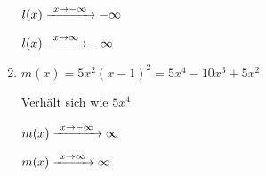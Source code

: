 \begin{Answer}[ref=ganzVerA1]
\begin{minipage}{\textwidth}
\begin{minipage}[t]{0.5\textwidth}
\begin{enumerate}[label=\alph*)]
				\(l(x)\xrightarrow{\hphantom{\ }x\to-\infty\hphantom{\ }}-\infty\)

				\(l(x)\xrightarrow{\hphantom{\ }x\to\infty\hphantom{\ }}-\infty\)
				\item \(m(x)=5x^2\left(x-1\right)^2=5x^4-10x^3+5x^2\)

				Verhält sich wie \(5x^4\)

				\(m(x)\xrightarrow{\hphantom{\ }x\to-\infty\hphantom{\ }}\infty\)

				\(m(x)\xrightarrow{\hphantom{\ }x\to\infty\hphantom{\ }}\infty\)
			\end{enumerate}
		\end{minipage}%
	\end{minipage}
\end{Answer}